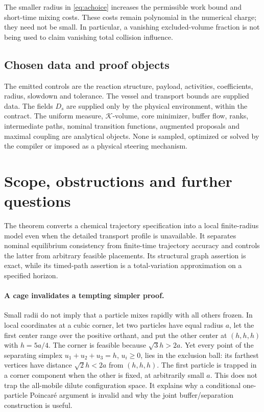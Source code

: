 \documentclass[11pt]{article}
\numberwithin{equation}{section}
\theoremstyle{definition}
\theoremstyle{remark}\newtheorem{remark}[theorem]{Remark}
\newcommand{\K}{\mathcal K}
\begin{document}
The smaller radius in \eqref{eq:achoice} increases the permissible work
bound and short-time mixing costs. These costs remain polynomial in the
numerical charge; they need not be small. In particular, a vanishing
excluded-volume fraction is not being used to claim vanishing total
collision influence.

\subsection{Chosen data and proof objects}

The emitted controls are the reaction structure, payload, activities,
coefficients, radius, slowdown and tolerance. The vessel and transport
bounds are supplied data. The fields $D_s$ are supplied only by the
physical environment, within the contract. The uniform measure,
$\K$-volume, core minimizer, buffer flow, ranks, intermediate paths,
nominal transition functions, augmented proposals and maximal coupling
are analytical objects. None is sampled, optimized or solved by the
compiler or imposed as a physical steering mechanism.



\section{Scope, obstructions and further questions}
\label{sec:scope}

The theorem converts a chemical trajectory specification into a local
finite-radius model even when the detailed transport profile is unavailable.
It separates nominal equilibrium consistency from finite-time trajectory
accuracy and controls the latter from arbitrary feasible placements. Its
structural graph assertion is exact, while its timed-path assertion is a
total-variation approximation on a specified horizon.

\paragraph{A cage invalidates a tempting simpler proof.}
Small radii do not imply that a particle mixes rapidly with all others
frozen. In local coordinates at a cubic corner, let two particles have equal
radius $a$, let the first center range over the positive orthant, and put
the other center at $(h,h,h)$ with $h=5a/4$. The corner is feasible because
$\sqrt3h>2a$. Yet every point of the separating simplex
$u_1+u_2+u_3=h$, $u_i\ge0$, lies in the exclusion ball: its farthest
vertices have distance $\sqrt2h<2a$ from $(h,h,h)$. The first particle is
trapped in a corner component when the other is fixed, at arbitrarily
small $a$. This does not trap the all-mobile dilute configuration space.
It explains why a conditional one-particle Poincar\'e argument is invalid
and why the joint buffer/separation construction is useful.
\end{document}
